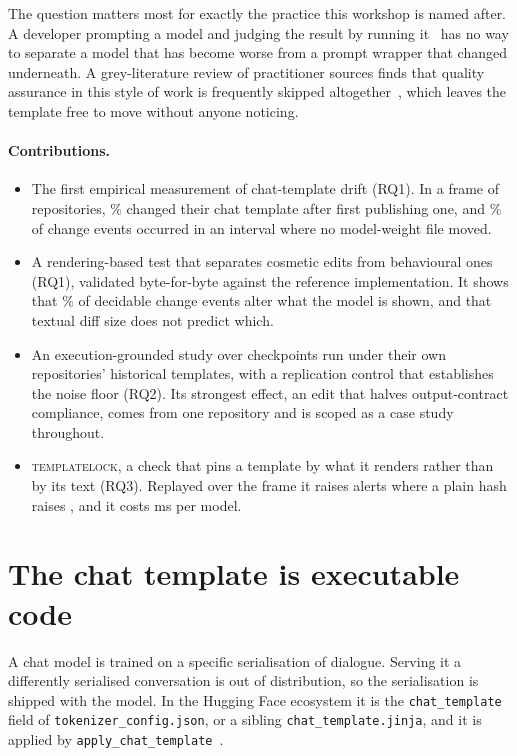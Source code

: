 The question matters most for exactly the practice this workshop is named after. A developer
prompting a model and judging the result by running it~\cite{fawzy2026verification} has no way to
separate a model that has become worse from a prompt wrapper that changed underneath. A grey-literature
review of  practitioner sources finds that quality assurance in this style of work is
frequently skipped altogether~\cite{fawzy2026vibepractice}, which leaves the template free to move
without anyone noticing.

\paragraph{Contributions.}
\begin{itemize}[leftmargin=*,itemsep=1pt,topsep=2pt]
\item The first empirical measurement of chat-template drift (RQ1). In a frame of \NFrame{}
  repositories, \PctDrifted\% changed their chat template after first publishing one, and
  \PctEventsWeightSilent\% of change events occurred in an interval where no model-weight file
  moved.
\item A rendering-based test that separates cosmetic edits from behavioural ones (RQ1), validated
  byte-for-byte against the reference implementation. It shows that \PctEventsBeh\% of decidable
  change events alter what the model is shown, and that textual diff size does not predict which.
\item An execution-grounded study over \NCheckpoints{} checkpoints run under their own repositories'
  historical templates, with a replication control that establishes the noise floor (RQ2). Its
  strongest effect, an edit that halves output-contract compliance, comes from one repository and is
  scoped as a case study throughout.
\item \textsc{templatelock}, a check that pins a template by what it renders rather than by its
  text (RQ3). Replayed over the frame it raises \RenderAlerts{} alerts where a plain hash raises
  \NaiveAlerts{}, and it costs \CostComputeMs{} ms per model.
\end{itemize}

\section{The chat template is executable code}

A chat model is trained on a specific serialisation of dialogue. Serving it a differently
serialised conversation is out of distribution, so the serialisation is shipped with the model. In
the Hugging Face ecosystem it is the \texttt{chat\_\allowbreak template} field of
\texttt{tokenizer\_\allowbreak config.\allowbreak json}, or a sibling
\texttt{chat\_\allowbreak template.\allowbreak jinja}, and it is applied by
\texttt{apply\_\allowbreak chat\_\allowbreak template}~\cite{hfchattemplating}.


